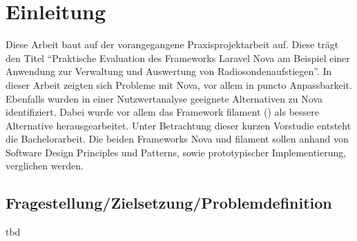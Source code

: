 \section{Einleitung}

Diese Arbeit baut auf der vorangegangene Praxisprojektarbeit auf.
Diese trägt den Titel \enquote{Praktische Evaluation des Frameworks Laravel Nova am Beispiel einer Anwendung zur Verwaltung und Auswertung von Radiosondenaufstiegen}.
In dieser Arbeit zeigten sich Probleme mit Nova, vor allem in puncto Anpassbarkeit.
Ebenfalls wurden in einer Nutzwertanalyse geeignete Alternativen zu Nova identifiziert.
Dabei wurde vor allem das Framework filament (\cite{filament}) als bessere Alternative herausgearbeitet.
Unter Betrachtung dieser kurzen Vorstudie entsteht die Bachelorarbeit.
Die beiden Frameworks Nova und filament sollen anhand von Software Design Principles und Patterns, sowie prototypischer Implementierung, verglichen werden.

\subsection{Fragestellung/Zielsetzung/Problemdefinition}
tbd
